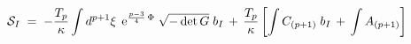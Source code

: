 \begin{equation}  
{\cal S}_I \;=\; - \frac{T_p}{\kappa} \int d^{p+1} \xi \;\, {\rm
e}^{\frac{p-3}{4}\, \Phi} \;\sqrt{- \det G}\; b_I \,+\,
\frac{T_p}{\kappa} \left[ \int C_{(p+1)}\; b_I \,+\, \int A_{(p+1)}
\right]
\label{pfracI}
\end{equation}

